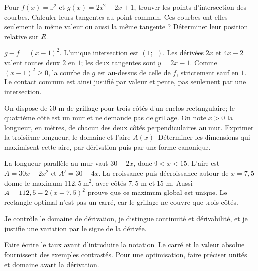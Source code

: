 \label{t11s-c04-p01}
Pour $f(x)=x^2$ et $g(x)=2x^2-2x+1$, trouver les points d’intersection des courbes. Calculer leurs tangentes au point commun. Ces courbes ont-elles seulement la même valeur ou aussi la même tangente ? Déterminer leur position relative sur $R$.
\begin{corrige}\label{sol-t11s-c04-p01}
$g-f=(x-1)^2$. L’unique intersection est $(1;1)$. Les dérivées $2x$ et $4x-2$ valent toutes deux $2$ en $1$; les deux tangentes sont $y=2x-1$. Comme $(x-1)^2\ge0$, la courbe de $g$ est au-dessus de celle de $f$, strictement sauf en $1$. Le contact commun est ainsi justifié par valeur et pente, pas seulement par une intersection.
\end{corrige}
\label{t11s-c04-p02}
On dispose de $30$ m de grillage pour trois côtés d’un enclos rectangulaire; le quatrième côté est un mur et ne demande pas de grillage. On note $x>0$ la longueur, en mètres, de chacun des deux côtés perpendiculaires au mur. Exprimer la troisième longueur, le domaine et l’aire $A(x)$. Déterminer les dimensions qui maximisent cette aire, par dérivation puis par une forme canonique.
\begin{corrige}\label{sol-t11s-c04-p02}
La longueur parallèle au mur vaut $30-2x$, donc $0<x<15$. L’aire est $A=30x-2x^2$ et $A'=30-4x$. La croissance puis décroissance autour de $x=7{,}5$ donne le maximum $112{,}5\ \mathrm{m}^2$, avec côtés $7{,}5$ m et $15$ m. Aussi $A=112{,}5-2(x-7{,}5)^2$ prouve que ce maximum global est unique. Le rectangle optimal n’est pas un carré, car le grillage ne couvre que trois côtés.
\end{corrige}

\begin{jemeteste}Je contrôle le domaine de dérivation, je distingue continuité et dérivabilité, et je justifie une variation par le signe de la dérivée.\end{jemeteste}
\begin{notepourlaclasse}Faire écrire le taux avant d’introduire la notation. Le carré et la valeur absolue fournissent des exemples contrastés. Pour une optimisation, faire préciser unités et domaine avant la dérivation.\end{notepourlaclasse}
